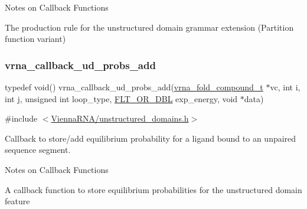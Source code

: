 \begin{DoxyRefDesc}{Notes on Callback Functions}
\item[\hyperlink{callbacks__callbacks000009}{Notes on Callback Functions}]The production rule for the unstructured domain grammar extension (Partition function variant) \end{DoxyRefDesc}
\mbox{\label{group__domains__up_gab10498abc84fcaf336aca8f8d7d42eb2}} 
\subsubsection{\texorpdfstring{vrna\+\_\+callback\+\_\+ud\+\_\+probs\+\_\+add}{vrna\_callback\_ud\_probs\_add}}
{\footnotesize\ttfamily typedef void() vrna\+\_\+callback\+\_\+ud\+\_\+probs\+\_\+add(\hyperlink{group__fold__compound_ga1b0cef17fd40466cef5968eaeeff6166}{vrna\+\_\+fold\+\_\+compound\+\_\+t} $\ast$vc, int i, int j, unsigned int loop\+\_\+type, \hyperlink{group__data__structures_ga31125aeace516926bf7f251f759b6126}{F\+L\+T\+\_\+\+O\+R\+\_\+\+D\+BL} exp\+\_\+energy, void $\ast$data)}



{\ttfamily \#include $<$\hyperlink{unstructured__domains_8h}{Vienna\+R\+N\+A/unstructured\+\_\+domains.\+h}$>$}



Callback to store/add equilibrium probability for a ligand bound to an unpaired sequence segment. 

\begin{DoxyRefDesc}{Notes on Callback Functions}
\item[\hyperlink{callbacks__callbacks000010}{Notes on Callback Functions}]A callback function to store equilibrium probabilities for the unstructured domain feature \end{DoxyRefDesc}
\mbox{\label{group__domains__up_gaa10ba1b6f1e179ea84c5caca9cdaae67}} 
